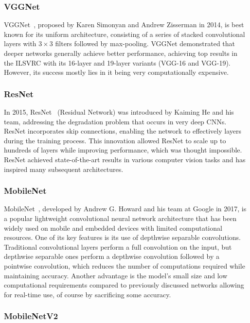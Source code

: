 \subsubsection{VGGNet}

VGGNet~\cite{Simonyan2014}, proposed by Karen Simonyan and Andrew Zisserman in
2014, is best known for its uniform architecture, consisting of a series of
stacked convolutional layers with $3 \times 3$ filters followed by max-pooling.
VGGNet demonstrated that deeper networks generally achieve better performance,
achieving top results in the ILSVRC with its 16-layer and 19-layer variants
(VGG-16 and VGG-19). However, its success mostly lies in it being very
computationally expensive.


\subsubsection{ResNet}

In 2015, ResNet~\cite{He2015} (Residual Network) was introduced by Kaiming He
and his team, addressing the degradation problem that occurs in very deep CNNs.
ResNet incorporates skip connections, enabling the network to effectively
 layers during the training process. This innovation allowed ResNet to
scale up to hundreds of layers while improving performance, which was thought
impossible. ResNet achieved state-of-the-art results in various computer vision
tasks and has inspired many subsequent architectures.


\subsubsection{MobileNet}

MobileNet~\cite{Howard2017}, developed by Andrew G. Howard and his team at
Google in 2017, is a popular lightweight convolutional neural network
architecture that has been widely used on mobile and embedded devices with
limited computational resources. One of its key features is its use of depthwise
separable convolutions. Traditional convolutional layers perform a full
convolution on the input, but depthwise separable ones perform a depthwise
convolution followed by a pointwise convolution, which reduces the number of
computations required while maintaining accuracy. Another advantage is the
model's small size and low computational requirements compared to previously
discussed networks allowing for real-time use, of course by sacrificing some
accuracy.


\subsubsection{MobileNetV2}


